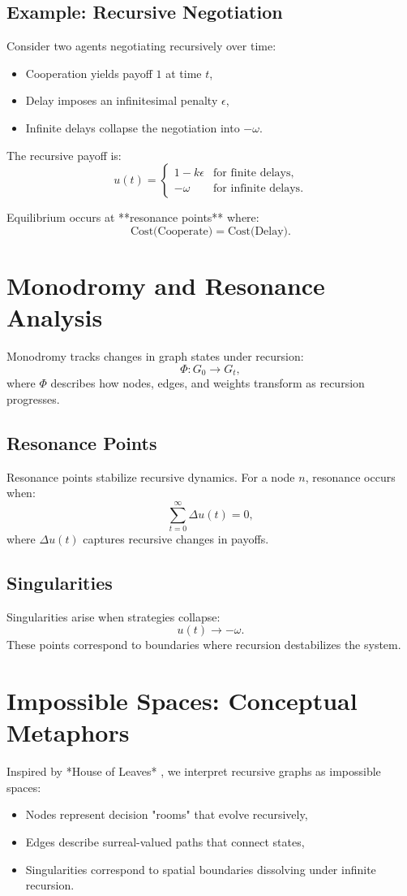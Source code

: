\documentclass[12pt]{article}
\begin{document}
\subsection{Example: Recursive Negotiation}
Consider two agents negotiating recursively over time:
\begin{itemize}
    \item Cooperation yields payoff \( 1 \) at time \( t \),
    \item Delay imposes an infinitesimal penalty \( \epsilon \),
    \item Infinite delays collapse the negotiation into \( -\omega \).
\end{itemize}
The recursive payoff is:
\[
u(t) = \begin{cases}
1 - k\epsilon & \text{for finite delays,} \\
-\omega & \text{for infinite delays.}
\end{cases}
\]

Equilibrium occurs at **resonance points** where:
\[
\text{Cost(Cooperate)} = \text{Cost(Delay)}.
\]

\section{Monodromy and Resonance Analysis}
Monodromy tracks changes in graph states under recursion:
\[
\Phi: G_0 \to G_t,
\]
where \( \Phi \) describes how nodes, edges, and weights transform as recursion progresses.

\subsection{Resonance Points}
Resonance points stabilize recursive dynamics. For a node \( n \), resonance occurs when:
\[
\sum_{t=0}^\infty \Delta u(t) = 0,
\]
where \( \Delta u(t) \) captures recursive changes in payoffs.

\subsection{Singularities}
Singularities arise when strategies collapse:
\[
u(t) \to -\omega.
\]
These points correspond to boundaries where recursion destabilizes the system.

\section{Impossible Spaces: Conceptual Metaphors}
Inspired by *House of Leaves* \cite{danielewski2000house}, we interpret recursive graphs as impossible spaces:
\begin{itemize}
    \item Nodes represent decision "rooms" that evolve recursively,
    \item Edges describe surreal-valued paths that connect states,
    \item Singularities correspond to spatial boundaries dissolving under infinite recursion.
\end{itemize}
\end{document}
